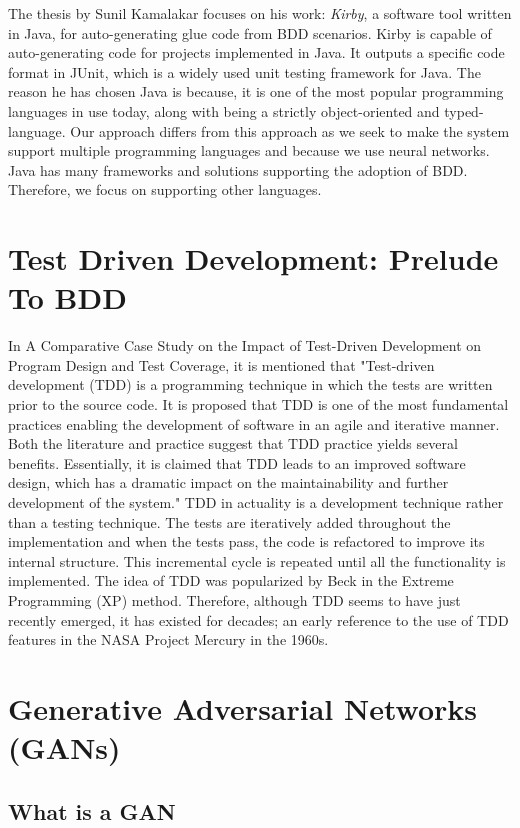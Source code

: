 \documentclass[conference]{IEEEtran}
\begin{document}
The thesis by Sunil Kamalakar focuses on his work: \textit{Kirby}, a software tool written in Java, for auto-generating glue code from BDD scenarios. Kirby is capable of auto-generating code for projects implemented in Java. It outputs a speciﬁc code format in JUnit, which is a widely used unit testing framework for Java. The reason he has chosen Java is because, it is one of the most popular programming languages in use today, along with being a strictly object-oriented and typed-language.\cite{a2} Our approach differs from this approach as we seek to make the system support multiple programming languages and because we use neural networks.
Java has many frameworks and solutions supporting the adoption of BDD. Therefore, we focus on supporting other languages.

\section{Test Driven Development: Prelude To BDD}
In A Comparative Case Study on the Impact of
Test-Driven Development on Program Design and Test Coverage, it is mentioned that "Test-driven development (TDD) is a programming technique in which the tests are written prior to the source code. It is proposed that TDD is one of the most fundamental practices enabling the development of software in an agile and iterative manner. Both the literature and practice suggest that TDD practice yields
several benefits. Essentially, it is claimed that TDD leads to an improved software design, which has a dramatic impact on the maintainability and further development of the system."\cite{b6} TDD in actuality is a development technique rather than a testing technique.\cite{b7} The tests are iteratively added throughout the implementation and when the tests pass, the code is refactored to improve its internal structure. This incremental cycle is repeated until all the functionality is implemented.\cite{b8} The idea of TDD was popularized by Beck\cite{b9} in the Extreme Programming (XP) method. Therefore, although TDD seems to have just recently emerged, it has existed for decades; an early reference to the use of TDD features
in the NASA Project Mercury in the 1960s\cite{b10}. 

\section{Generative Adversarial Networks (GANs)}
\subsection{What is a GAN}
\end{document}
